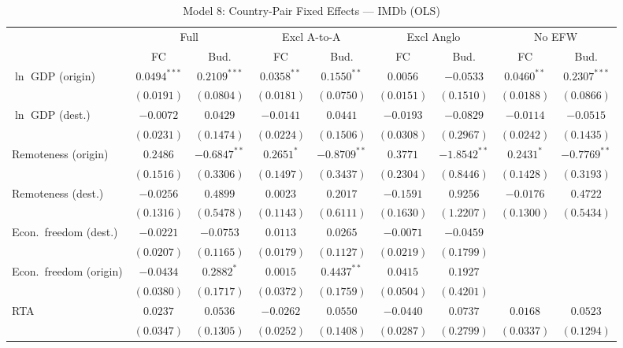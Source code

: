 \begin{table}[htbp]
\centering
\caption{Model 8: Country-Pair Fixed Effects --- IMDb (OLS)}
\label{tab:model8}
\footnotesize
\begin{tabular}{l cc cc cc cc }
\toprule
  & \multicolumn{2}{c}{Full} & \multicolumn{2}{c}{Excl A-to-A} & \multicolumn{2}{c}{Excl Anglo} & \multicolumn{2}{c}{No EFW} \\
\cmidrule(lr){2-3}
\cmidrule(lr){4-5}
\cmidrule(lr){6-7}
\cmidrule(lr){8-9}
  & FC & Bud. & FC & Bud. & FC & Bud. & FC & Bud. \\
\midrule
$\ln$ GDP (origin) & $0.0494^{***}$ & $0.2109^{***}$ & $0.0358^{**}$ & $0.1550^{**}$ & $0.0056$ & $-0.0533$ & $0.0460^{**}$ & $0.2307^{***}$ \\
 & $(0.0191)$ & $(0.0804)$ & $(0.0181)$ & $(0.0750)$ & $(0.0151)$ & $(0.1510)$ & $(0.0188)$ & $(0.0866)$ \\[4pt]
$\ln$ GDP (dest.) & $-0.0072$ & $0.0429$ & $-0.0141$ & $0.0441$ & $-0.0193$ & $-0.0829$ & $-0.0114$ & $-0.0515$ \\
 & $(0.0231)$ & $(0.1474)$ & $(0.0224)$ & $(0.1506)$ & $(0.0308)$ & $(0.2967)$ & $(0.0242)$ & $(0.1435)$ \\[4pt]
Remoteness (origin) & $0.2486$ & $-0.6847^{**}$ & $0.2651^{*}$ & $-0.8709^{**}$ & $0.3771$ & $-1.8542^{**}$ & $0.2431^{*}$ & $-0.7769^{**}$ \\
 & $(0.1516)$ & $(0.3306)$ & $(0.1497)$ & $(0.3437)$ & $(0.2304)$ & $(0.8446)$ & $(0.1428)$ & $(0.3193)$ \\[4pt]
Remoteness (dest.) & $-0.0256$ & $0.4899$ & $0.0023$ & $0.2017$ & $-0.1591$ & $0.9256$ & $-0.0176$ & $0.4722$ \\
 & $(0.1316)$ & $(0.5478)$ & $(0.1143)$ & $(0.6111)$ & $(0.1630)$ & $(1.2207)$ & $(0.1300)$ & $(0.5434)$ \\[4pt]
Econ.\ freedom (dest.) & $-0.0221$ & $-0.0753$ & $0.0113$ & $0.0265$ & $-0.0071$ & $-0.0459$ & &  \\
 & $(0.0207)$ & $(0.1165)$ & $(0.0179)$ & $(0.1127)$ & $(0.0219)$ & $(0.1799)$ & &  \\[4pt]
Econ.\ freedom (origin) & $-0.0434$ & $0.2882^{*}$ & $0.0015$ & $0.4437^{**}$ & $0.0415$ & $0.1927$ & &  \\
 & $(0.0380)$ & $(0.1717)$ & $(0.0372)$ & $(0.1759)$ & $(0.0504)$ & $(0.4201)$ & &  \\[4pt]
RTA & $0.0237$ & $0.0536$ & $-0.0262$ & $0.0550$ & $-0.0440$ & $0.0737$ & $0.0168$ & $0.0523$ \\
 & $(0.0347)$ & $(0.1305)$ & $(0.0252)$ & $(0.1408)$ & $(0.0287)$ & $(0.2799)$ & $(0.0337)$ & $(0.1294)$ \\[4pt]

\end{tabular}
\end{table}
